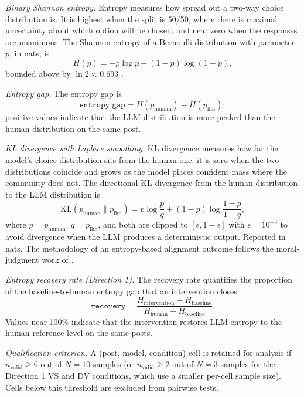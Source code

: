 \textit{Binary Shannon entropy.} Entropy measures how spread out a
two-way choice distribution is. It is highest when the split is 50/50,
where there is maximal uncertainty about which option will be chosen,
and near zero when the responses are unanimous. The Shannon entropy of
a Bernoulli distribution with parameter $p$, in nats, is
\begin{equation}
  H(p) = -p \log p - (1 - p) \log (1 - p),
  \label{eq:m_entropy}
\end{equation}
bounded above by $\ln 2 \approx 0.693$
\citep{shannon-1948-entropy}.

\textit{Entropy gap.} The entropy gap is
\begin{equation}
  \texttt{entropy\_gap} = H(p_{\text{human}}) - H(p_{\text{llm}});
  \label{eq:m_egap}
\end{equation}
positive values indicate that the LLM distribution is more peaked
than the human distribution on the same post.

\textit{KL divergence with Laplace smoothing.} KL divergence measures
how far the model's choice distribution sits from the human one: it is
zero when the two distributions coincide and grows as the model places
confident mass where the community does not. The directional KL
divergence from the human distribution to the LLM distribution is
\begin{equation}
  \mathrm{KL}(p_{\text{human}} \| p_{\text{llm}}) = p \log \frac{p}{q} + (1 - p) \log \frac{1 - p}{1 - q},
  \label{eq:m_kl}
\end{equation}
where $p = p_{\text{human}}$, $q = p_{\text{llm}}$, and both are
clipped to $[\epsilon, 1 - \epsilon]$ with $\epsilon = 10^{-3}$ to
avoid divergence when the LLM produces a deterministic output.
Reported in nats. The methodology of an entropy-based alignment
outcome follows the moral-judgment work of
\citet{russo-2026-pluralistic}.

\textit{Entropy recovery rate (Direction 1).} The recovery rate
quantifies the proportion of the baseline-to-human entropy gap that an
intervention closes:
\begin{equation}
  \texttt{recovery} = \frac{H_{\text{intervention}} - H_{\text{baseline}}}{H_{\text{human}} - H_{\text{baseline}}}.
  \label{eq:m_recovery}
\end{equation}
Values near 100\% indicate that the intervention restores LLM entropy
to the human reference level on the same posts.

\textit{Qualification criterion.} A (post, model, condition) cell is
retained for analysis if $n_{\text{valid}} \geq 6$ out of $N{=}10$
samples (or $n_{\text{valid}} \geq 2$ out of $N{=}3$ samples for the
Direction 1 VS and DV conditions, which use a smaller per-cell sample
size). Cells below this threshold are excluded from pairwise tests.

